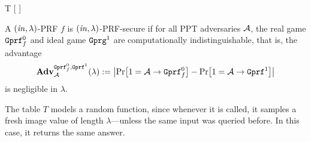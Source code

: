 \begin{security}
\begin{codebox}
\begin{center}
\begin{pchstack}
\begin{pcvstack}
{				T\text{:} \< \quad {}[ \to {}] 
			              }
										\pcvspace
		\end{pcvstack}
	\end{pchstack}
	\end{center}
\end{codebox}
\vspace{5mm}
A $(\mathit{in},\lambda)$-PRF $f$ is $(\mathit{in},\lambda)$-PRF-secure if for all PPT adversaries $\mathcal{A}$, the real game $\text{\texttt{Gprf}}_f^0$ and ideal game $\text{\texttt{Gprg}}^1$ are computationally indistinguishable, that is, the advantage
\[\mathbf{Adv}_{\adv}^{
  \M{Gprf}_f^0,
  \M{Gprf}^1}
	(\lambda):=\abs{\prob{1=\adv\circ \M{Gprf}_f^0}-\prob{1=\adv\circ \M{Gprf}^1}}\]
is negligible in $\lambda$.
\end{security}

\begin{remark}
The table $T$ models a random function, since whenever it is called, it samples a fresh image value of length $\lambda$---unless the same input was queried before. In this case, it returns the same answer.
\end{remark}





